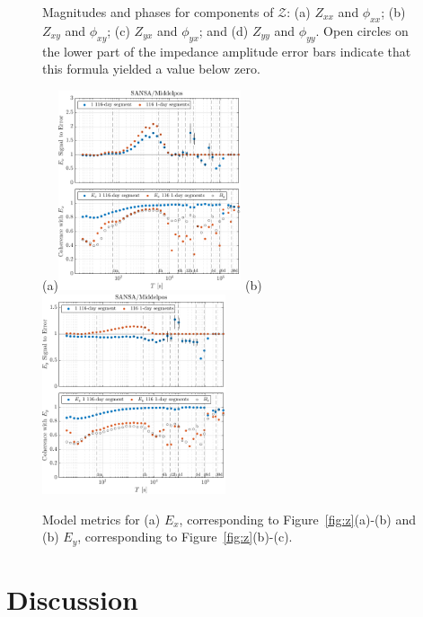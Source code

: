 \documentclass[draft,linenumbers]{agujournal2018}
\begin{document}
\begin{figure}[h!]
  \caption{Magnitudes and phases for components of $\boldsymbol{\mathcal{Z}}$: (a) $Z_{xx}$ and $\phi_{xx}$; (b) $Z_{xy}$ and $\phi_{xy}$; (c) $Z_{yx}$ and $\phi_{yx}$; and (d) $Z_{yy}$ and $\phi_{yy}$. Open circles on the lower part of the impedance amplitude error bars indicate that this formula yielded a value below zero.}
    \label{fig:z}

  \subfigure(a){\includegraphics[width=0.48\textwidth]{figures/snplot-Middelpos-tf1-E_x.pdf}} 
  \subfigure(b){\includegraphics[width=0.48\textwidth]{figures/snplot-Middelpos-tf1-E_y.pdf}} 

  \caption{Model metrics for (a) $E_x$, corresponding to Figure~\ref{fig:z}(a)-(b) and (b) $E_y$, corresponding to Figure~\ref{fig:z}(b)-(c).}
  \label{fig:se}

\end{figure}


\clearpage

\section{Discussion}
\end{document}
